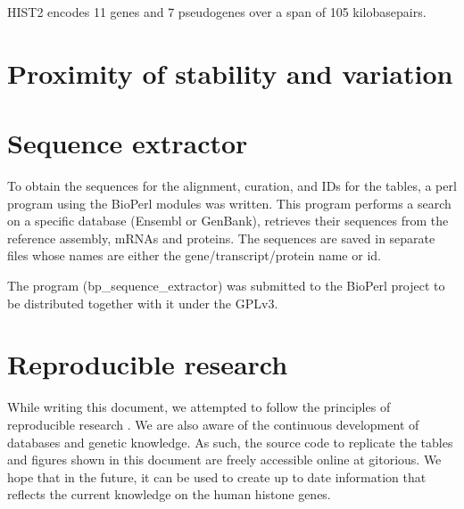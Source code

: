\documentclass[10pt,a4paper,draft]{article}
\begin{document}
    HIST2 encodes 11 genes and 7 pseudogenes over a span of 105 kilobasepairs.

  \section{Proximity of stability and variation}

  \section{Sequence extractor}
    To obtain the sequences for the alignment, curation, and IDs for the tables, a perl program using the
    BioPerl modules was written. This program performs a search on a specific database (Ensembl or GenBank), retrieves
    their sequences from the reference assembly, mRNAs and proteins. The sequences are saved in separate files whose
    names are either the gene/transcript/protein name or id.
    
    The program (bp\_sequence\_extractor) was submitted to the BioPerl project to be distributed together with it under the GPLv3.

  \section{Reproducible research}
    While writing this document, we attempted to follow the principles of reproducible research \cite{reproducible-research-bioinformatics, reproducible-research-law}.
    We are also aware of the continuous development of databases and genetic knowledge. As such,
    the source code to replicate the tables and figures shown in this document are freely accessible
    online at gitorious. We hope that in the future, it can be used to create up to date information
    that reflects the current knowledge on the human histone genes.
\end{document}
